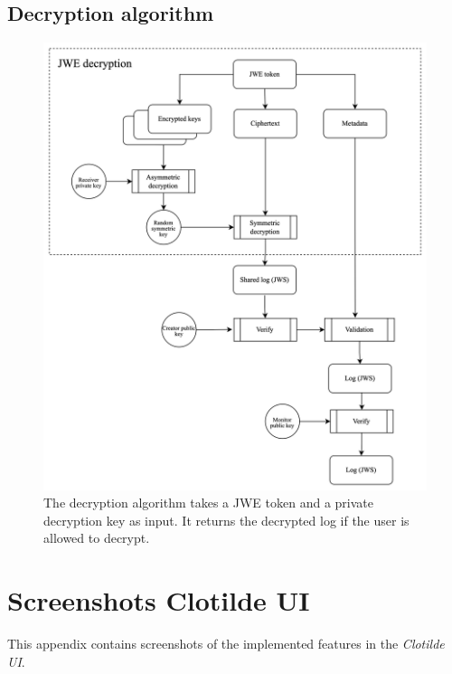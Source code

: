 \documentclass[../main.tex]{subfiles}
\begin{document}
\section{Decryption algorithm}
\label{app:decryption}
\begin{figure}[h]
    \includegraphics[scale=0.13]{../img/05/decrypt_logs.jpg}
    \centering
    \caption{The decryption algorithm takes a JWE token and a private decryption key as input. It returns the decrypted log if the user is allowed to decrypt.}
    \label{app:decryption_algo}
\end{figure}

\chapter{Screenshots Clotilde UI}

This appendix contains screenshots of the implemented features in the \textit{Clotilde UI}.
\end{document}
